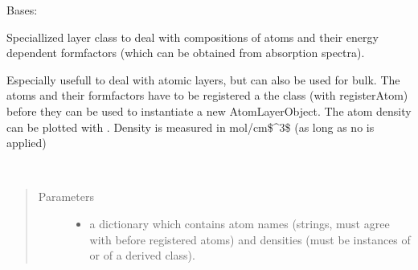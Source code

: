 \documentclass[letterpaper,10pt,english]{sphinxmanual}
\begin{document}

\begin{fulllineitems}
\label{\detokenize{modules-api/samplerepresentation:SampleRepresentation.AtomLayerObject}}
Bases: {\hyperref[\detokenize{modules-api/samplerepresentation:SampleRepresentation.LayerObject}]{}}

Speciallized layer class to deal with compositions of atoms and their energy dependent formfactors (which can be obtained from absorption spectra).

Especially usefull to deal with atomic layers, but can also be used for bulk.
The atoms and their formfactors have to be registered a the class (with registerAtom) before they can be used to instantiate a new AtomLayerObject.
The atom density can be plotted with {\hyperref[\detokenize{modules-api/samplerepresentation:SampleRepresentation.plotAtomDensity}]{}}.
Density is measured in mol/cm\$\textasciicircum{}3\$ (as long as no  is applied)

\begin{fulllineitems}
\label{\detokenize{modules-api/samplerepresentation:SampleRepresentation.AtomLayerObject.__init__}}~\begin{quote}\begin{description}
\item[{Parameters}] \leavevmode\begin{itemize}
\item {} 
 \textendash{} a dictionary which contains atom names (strings, must agree with before registered atoms) and densities (must be instances of {\hyperref[\detokenize{modules-api/parameters:Parameters.Parameter}]{}} or of a derived class).


\end{itemize}
\end{description}
\end{quote}
\end{fulllineitems}
\end{fulllineitems}
\end{document}
